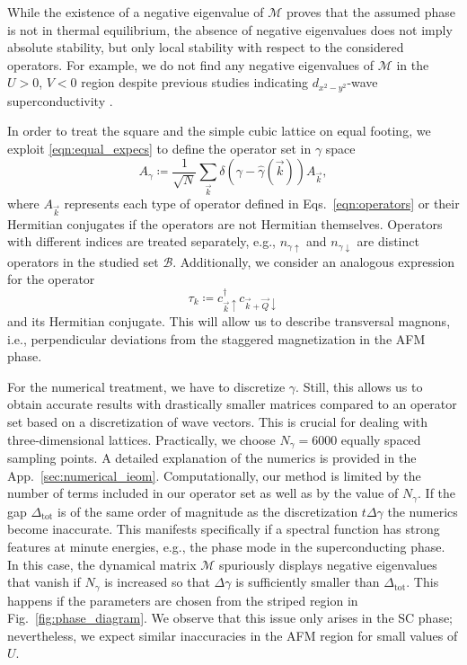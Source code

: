 \documentclass[
    reprint, 
    aps,
    preprintnumbers,
    twocolumn,
    prb,
    superscriptaddress
]{revtex4-2}
\newcommand{\vk}{\vec{k}}
\newcommand{\up}{\uparrow}
\newcommand{\down}{\downarrow}
\newcommand{\mM}{\mathcal{M}}
\begin{document}
While the existence of a negative eigenvalue of $\mM$ proves that the assumed phase is
not in thermal equilibrium, the absence of negative eigenvalues does not imply absolute stability,
but only local stability with respect to the considered operators.
For example, we do not find any negative eigenvalues of $\mM$ in the $U>0$, $V<0$ region despite previous studies indicating $d_{x^2 - y^2}$-wave superconductivity \cite{Micnas88b,Huang13}.

In order to treat the square and the simple cubic lattice on equal footing, we exploit 
\eqref{eqn:equal_expecs} to define the operator set in $\gamma$ space
\begin{equation}
    \label{eqn:ieom_basis_operator}
    A_\gamma \coloneqq \frac{1}{\sqrt{N}} \sum_{\vk} \delta (\gamma - \widehat{\gamma}( \vk )) A_{\vk},
\end{equation}
where $A_{\vk}$ represents each type of operator defined in Eqs.~\eqref{eqn:operators} or
their Hermitian conjugates if the operators are not Hermitian themselves.
Operators with different indices are treated separately, e.g., $n_{\gamma \up}$ and $n_{\gamma \down}$ 
are distinct operators in the studied set $\mathcal{B}$.
Additionally, we consider an analogous expression for the operator
\begin{equation}
  \tau_k \coloneqq c_{\vec{k}\uparrow}^\dagger c_{\vec{k}+\vec{Q}\downarrow}
\end{equation}
and its Hermitian conjugate.
This will allow us to describe transversal magnons, i.e., perpendicular 
deviations from the staggered magnetization in the AFM phase.


For the numerical treatment, we have to discretize $\gamma$.
Still, this allows us to obtain accurate results with drastically smaller matrices 
compared to an operator set based on a discretization of wave vectors.
This is crucial for dealing with three-dimensional lattices.
Practically, we choose $N_\gamma = 6000$ equally spaced sampling points.
A detailed explanation of the numerics is provided in the App.\ \ref{sec:numerical_ieom}.
Computationally, our method is limited by the number of terms included in our operator set 
as well as by the value of $N_\gamma$.
If the gap $\Delta_\text{tot}$ is of the same order of magnitude as the discretization $t \Delta \gamma$ the numerics become inaccurate.
This manifests specifically if a spectral function has strong features at minute energies, e.g., 
the phase mode in the superconducting phase.
In this case, the dynamical matrix $\mM$ spuriously displays negative eigenvalues that vanish if 
$N_\gamma$ is increased so that $\Delta \gamma$ is sufficiently smaller than $\Delta_\text{tot}$.
This happens if the parameters are chosen from the striped region in Fig.\ \ref{fig:phase_diagram}.
We observe that this issue only arises in the SC phase;
nevertheless, we expect similar inaccuracies in the AFM region for small values of $U$.
\end{document}
